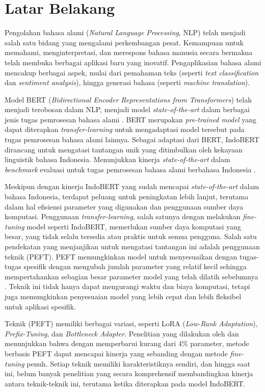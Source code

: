 \section{Latar Belakang}
\label{sec:latar-belakang}

Pengolahan bahasa alami (\textit{Natural Language Processing}, NLP) telah menjadi salah satu bidang yang mengalami perkembangan pesat. Kemampuan untuk memahami, menginterpretasi, dan merespons bahasa manusia secara bermakna telah membuka berbagai aplikasi baru yang inovatif. Pengaplikasian bahasa alami mencakup berbagai aspek, mulai dari pemahaman teks (seperti \textit{text classification} dan \textit{sentiment analysis}), hingga generasi bahasa (seperti \textit{machine translation}).

Model BERT (\textit{Bidirectional Encoder Representations from Transformers}) telah menjadi terobosan dalam NLP, menjadi model \textit{state-of-the-art} dalam berbagai jenis tugas pemrosesan bahasa alami \parencite{bert}. BERT merupakan \textit{pre-trained model} yang dapat diterapkan \textit{transfer-learning} untuk mengadaptasi model tersebut pada tugas pemrosesan bahasa alami lainnya. Sebagai adaptasi dari BERT, IndoBERT dirancang untuk mengatasi tantangan unik yang ditimbulkan oleh kekayaan linguistik bahasa Indonesia. Menunjukkan kinerja \textit{state-of-the-art} dalam \textit{benchmark} evaluasi untuk tugas pemrosesan bahasa alami berbahasa Indonesia \parencite{indobert}.

Meskipun dengan kinerja IndoBERT yang sudah mencapai \textit{state-of-the-art} dalam bahasa Indonesia, terdapat peluang untuk peningkatan lebih lanjut, terutama dalam hal efisiensi parameter yang digunakan dan penggunaan sumber daya komputasi. Penggunaan \textit{transfer-learning}, salah satunya dengan melakukan \textit{fine-tuning} model seperti IndoBERT, memerlukan sumber daya komputasi yang besar, yang tidak selalu tersedia atau praktis untuk semua pengguna. Salah satu pendekatan yang menjanjikan untuk mengatasi tantangan ini adalah penggunaan teknik \PEFT (PEFT). PEFT memungkinkan model untuk menyesuaikan dengan tugas-tugas spesifik dengan mengubah jumlah parameter yang relatif kecil sehingga mempertahankan sebagian besar parameter model yang telah dilatih sebelumnya \parencite{adapter}. Teknik ini tidak hanya dapat mengurangi waktu dan biaya komputasi, tetapi juga memungkinkan penyesuaian model yang lebih cepat dan lebih fleksibel untuk aplikasi spesifik. 

Teknik \PEFT (PEFT) memiliki berbagai variasi, seperti LoRA (\textit{Low-Rank Adaptation}), \textit{Prefix-Tuning}, dan \textit{Bottleneck Adapter}. Penelitian yang dilakukan oleh \citeauthor{adapter} \parencite{adapter} dan \citeauthor{uvpl} \parencite{uvpl} menunjukkan bahwa dengan memperbarui kurang dari 4\% parameter, metode berbasis PEFT dapat mencapai kinerja yang sebanding dengan metode \textit{fine-tuning} penuh. Setiap teknik memiliki karakteristiknya sendiri, dan hingga saat ini, belum banyak penelitian yang secara komprehensif membandingkan kinerja antara teknik-teknik ini, terutama ketika diterapkan pada model IndoBERT. 

